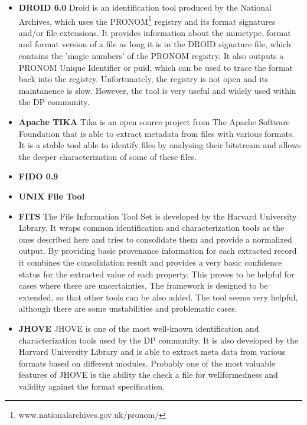\begin{itemize}
\item \textbf{DROID 6.0}\newline
Droid is an identification tool produced by the National Archives, which uses the PRONOM\footnote{www.nationalarchives.gov.uk/pronom/} registry and its format signatures and/or file extensions. It provides information about the mimetype, format and format version of a file as long it is in the DROID signature file, which contains the 'magic numbers' of the PRONOM registry. It also outputs a PRONOM Unique Identifier or puid, which can be used to trace the format back into the registry.
Unfortunately, the registry is not open and its maintanence is slow. However, the tool is very useful and widely used within the DP community.

\item \textbf{Apache TIKA}\newline
Tika is an open source project from The Apache Software Foundation that is able to extract metadata from files with various formats. It is a stable tool able to identify files by analysing their bitstream and allows the deeper characterization of some of these files.  

\item \textbf{FIDO 0.9}\newline

\item \textbf{UNIX File Tool}\newline

\item \textbf{FITS} \newline
The File Information Tool Set is developed by the Harvard University Library. It wraps common identification and characterization tools as the ones described here and tries to consolidate them and provide a normalized output. By providing basic provenance information for each extracted record it combines the consolidation result and provides a very basic confidence status for the extracted value of each property. This proves to be helpful for cases where there are uncertainties. The framework is designed to be extended, so that other tools can be also added. The tool seems very helpful, although there are some unstabilities and problematic cases.

\item \textbf{JHOVE}\newline
JHOVE is one of the most well-known identification and characterization tools used by the DP community. It is also developed by the Harvard University Library and is able to extract meta data from various formats based on different modules. Probably one of the most valuable features of JHOVE is the ability the check a file for wellformedness and validity against the format specification.


\end{itemize}
